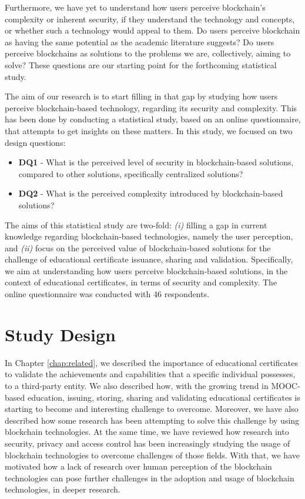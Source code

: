 Furthermore, we have yet to understand how users perceive blockchain's complexity or inherent security, if they understand the technology and concepts, or whether such a technology would appeal to them. Do users perceive blockchain as having the same potential as the academic literature suggests? Do users perceive blockchains as solutions to the problems we are, collectively, aiming to solve? These questions are our starting point for the forthcoming statistical study.

The aim of our research is to start filling in that gap by studying how users perceive blockchain-based technology, regarding its security and complexity. This has been done by conducting a statistical study, based on an online questionnaire, that attempts to get insights on these matters. In this study, we focused on two design questions:

\begin{itemize}
	\item \textbf{DQ1} - What is the perceived level of security in blockchain-based solutions, compared to other solutions, specifically centralized solutions?
	\item \textbf{DQ2} - What is the perceived complexity introduced by blockchain-based solutions?
\end{itemize}

The aims of this statistical study are two-fold: \emph{(i)} filling a gap in current knowledge regarding blockchain-based technologies, namely the user perception, and \emph{(ii)} focus on the perceived value of blockchain-based solutions for the challenge of educational certificate issuance, sharing and validation. Specifically, we aim at understanding how users perceive blockchain-based solutions, in the context of educational certificates, in terms of security and complexity. The online questionnaire was conducted with 46 respondents.

\section{Study Design}

In Chapter \ref{chap:related}, we described the importance of educational certificates to validate the achievements and capabilities that a specific individual possesses, to a third-party entity. We also described how, with the growing trend in MOOC-based education, issuing, storing, sharing and validating educational certificates is starting to become and interesting challenge to overcome. Moreover, we have also described how some research has been attempting to solve this challenge by using blockchain technologies. At the same time, we have reviewed how research into security, privacy and access control has been increasingly studying the usage of blockchain technologies to overcome challenges of those fields. With that, we have motivated how a lack of research over human perception of the blockchain technologies can pose further challenges in the adoption and usage of blockchain technologies, in deeper research.

